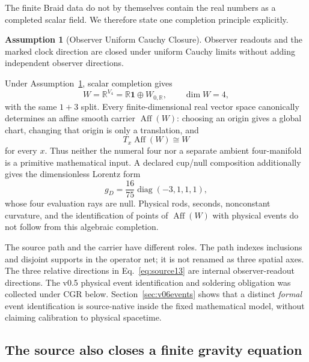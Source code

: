 \documentclass[11pt]{article}
\theoremstyle{definition}
\newtheorem{assumption}[theorem]{Assumption}
\theoremstyle{remark}
\newcommand{\id}{\mathbf{1}}
\begin{document}
The finite Braid data do not by themselves contain the real numbers as a completed scalar field. We therefore state one completion principle explicitly.
\begin{assumption}[Observer Uniform Cauchy Closure]\label{ass:rc}
Observer readouts and the marked clock direction are closed under uniform Cauchy limits without adding independent observer directions.
\end{assumption}
Under Assumption~\ref{ass:rc}, scalar completion gives
\begin{equation}\label{eq:affinecompletion}
 W=\mathbb R^{V_4}=\mathbb R\id\oplus W_{0,\mathbb R},
 \qquad \dim W=4,
\end{equation}
with the same $1+3$ split. Every finite-dimensional real vector space canonically determines an affine smooth carrier $\operatorname{Aff}(W)$: choosing an origin gives a global chart, changing that origin is only a translation, and
\begin{equation}\label{eq:tangentW}
 T_x\operatorname{Aff}(W)\cong W
\end{equation}
for every $x$. Thus neither the numeral four nor a separate ambient four-manifold is a primitive mathematical input. A declared cup/null composition additionally gives the dimensionless Lorentz form
\begin{equation}\label{eq:cupmetric}
 g_D=\frac{16}{75}\operatorname{diag}(-3,1,1,1),
\end{equation}
whose four evaluation rays are null. Physical rods, seconds, nonconstant curvature, and the identification of points of $\operatorname{Aff}(W)$ with physical events do not follow from this algebraic completion.

The source path and the carrier have different roles. The path indexes inclusions and disjoint supports in the operator net; it is not renamed as three spatial axes. The three relative directions in Eq.~\eqref{eq:source13} are internal observer-readout directions. The v0.5 physical event identification and soldering obligation was collected under CGR below. Section~\ref{sec:v06events} shows that a distinct \emph{formal} event identification is source-native inside the fixed mathematical model, without claiming calibration to physical spacetime.

\subsection{The source also closes a finite gravity equation}
\end{document}
